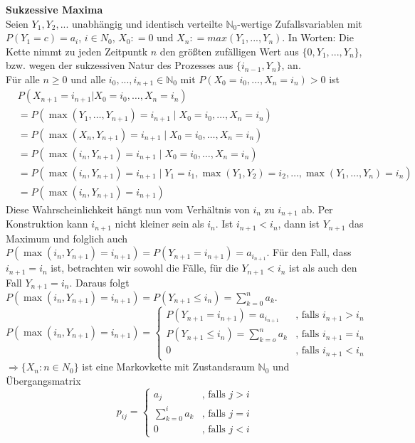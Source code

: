 \documentclass[a4paper,12pt]{article}
\begin{document}
\begin{tcolorbox}[breakable, colframe=blue, colback=white, title=Beispiel 4]
	\textbf{Sukzessive Maxima}\\
	Seien $Y_1, Y_2, ...$ unabhängig und identisch verteilte $\mathbb{N}_0$-wertige Zufallsvariablen mit $P(Y_1 = c) = a_i$, $i \in N_0$, $X_0: = 0$ und $X_n: = max(Y_1, ..., Y_n)$.
	In Worten: Die Kette nimmt zu jeden Zeitpuntk $n$ den größten zufälligen Wert aus $\{0,Y_1, ..., Y_n\}$, bzw. wegen der sukzessiven Natur des Prozesses
	aus $\{i_{n-1},Y_n\}$, an.\\
	Für alle $n \geq 0$ und alle $i_0, ..., i_{n+1} \in \mathbb{N}_0$ mit $P(X_0 = i_0, ..., X_n = i_n) > 0$ ist
\begin{align*}
	& P(X_{n+1} = i_{n+1} | X_0 = i_0, \dots, X_n = i_n) \\
	&=  P(\max(Y_1, \dots, Y_{n+1}) = i_{n+1} \mid X_0 = i_0, \dots, X_n = i_n) \\
	&=  P(\max(X_n, Y_{n+1}) = i_{n+1} \mid X_0 = i_0, \dots, X_n = i_n) \\
	&=  P(\max(i_n, Y_{n+1}) = i_{n+1} \mid X_0 = i_0, \dots, X_n = i_n) \\
	&=  P(\max(i_n, Y_{n+1}) = i_{n+1} \mid Y_1 = i_1, \max(Y_1, Y_2) = i_2, \dots, \max(Y_1, \dots, Y_n) = i_n) \\
	&=  P(\max(i_n, Y_{n+1}) = i_{n+1})
\end{align*}
Diese Wahrscheinlichkeit hängt nun vom Verhältnis von $i_n$ zu $i_{n+1}$ ab. Per Konstruktion kann $i_{n+1}$ nicht kleiner sein als $i_n$.
Ist $i_{n+1} < i_n$, dann ist $Y_{n+1}$ das Maximum und folglich auch $P(\max(i_n, Y_{n+1}) = i_{n+1}) =P(Y_{n+1}= i_{n+1})= a_{i_{n+1}}$. Für den Fall, 
dass $i_{n+1} = i_n$ ist, betrachten wir sowohl die Fälle, für die $Y_{n+1} < i_n$ ist als auch den Fall $Y_{n+1} = i_n$. Daraus folgt 
$P(\max(i_n, Y_{n+1}) = i_{n+1}) = P(Y_{n+1} \leq i_n) = \sum_{k=0}^{n}a_k $.
	$$
	P(\max(i_n, Y_{n+1}) = i_{n+1})= \begin{cases}
		P(Y_{n+1}=i_{n+1}) = a_{i_{n+1}} & \text{, falls } i_{n+1} > i_n \\
		P(Y_{n+1} \leq i_n) = \sum_{k=o}^{n}a_k & \text{, falls } i_{n+1} = i_n \\
		0 & \text{, falls } i_{n+1} < i_n
	\end{cases}
	$$
	$\Rightarrow \{X_n: n \in N_0 \}$ ist eine Markovkette mit Zustandsraum $\mathbb{N}_0$ und Übergangsmatrix
	$$
	p_{ij} = \begin{cases}
		a_j & \text{, falls } j>i\\
		\sum_{k=0}^{i}a_k & \text{, falls } j=i \\
		0 & \text{, falls } j<i
	\end{cases}
	$$
\end{tcolorbox}
\end{document}
